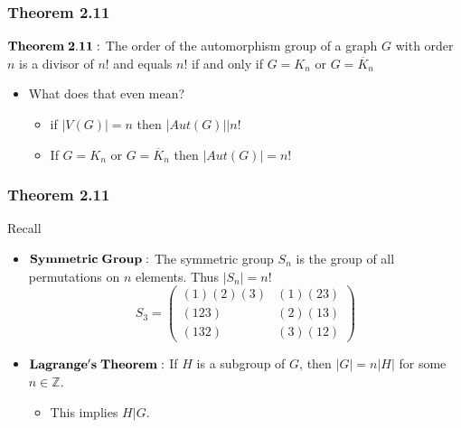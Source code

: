 \documentclass{beamer}
\begin{document}
\begin{frame}
\frametitle{Theorem 2.11}
\begin{center}
$\bold{Theorem \;2.11:}$ The order of the automorphism group of a graph $G$ with order $n$ is a divisor of $n!$ and equals $n!$ if and only if $G = K_n$ or $G = \overline{K}_n$
	\begin{itemize}
		\item What does that even mean?
		\vfill
			\begin{itemize}
				\item if $|V(G)| = n$ then $|Aut(G)| \bigl\vert n!$
				\vfill
				\item If $G = K_n$ or $G = \overline{K}_n$ then $|Aut(G)| = n!$
				\vfill
			\end{itemize}
		\end{itemize}
\end{center}
\end{frame}

\begin{frame}
\frametitle{Theorem 2.11}
Recall
\begin{center}
\begin{itemize}
	\item $\bold{Symmetric\;Group:}$ The symmetric group $S_n$ is the group of all permutations on $n$ elements. Thus $|S_n| = n!$
	\begin{equation*}
		S_3 = 	
		\begin{pmatrix}
		(1)(2)(3) &(1)(23)   \\
		(123)& (2)(13)   \\
		(132)& (3)(12)
		\end{pmatrix}
	\end{equation*}
	\item $\bold{Lagrange's\; Theorem:}$ If $H$ is a subgroup of $G$, then $|G| = n|H|$ for some $n \in \mathbb{Z}$.
		\begin{itemize}
			\item This implies $H \bigl\vert G$.
		\end{itemize}
	\end{itemize}
\end{center}
\end{frame}
\end{document}
